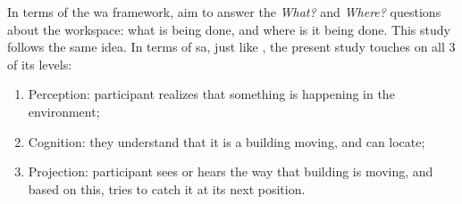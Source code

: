In terms of the \gls{wa} framework, \parencite{gutwin_chalk_2011} aim to answer the \textit{What?} and \textit{Where?} questions about the workspace: what is being done, and where is it being done. This study follows the same idea. In terms of \gls{sa}, just like \parencite{gutwin_chalk_2011}, the present study touches on all 3 of its levels: 
\begin{enumerate}
	\item Perception: participant realizes that something is happening in the environment;
	\item Cognition: they understand that it is a building moving, and can locate;
	\item Projection: participant sees or hears the way that building is moving, and based on this, tries to catch it at its next position.
\end{enumerate}

